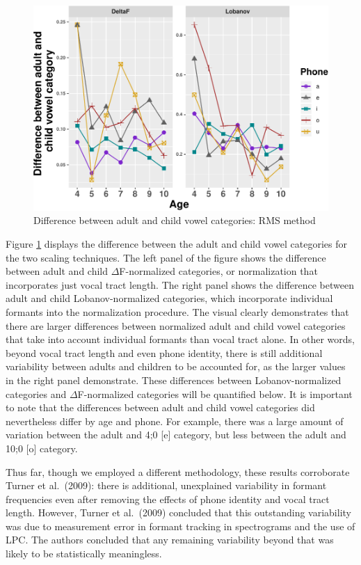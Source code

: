 \documentclass[
]{article}
\begin{document}
\begin{figure}
\centering
\includegraphics{3_vtl_results_files/figure-latex/rms-dif-figure-1.pdf}
\caption{\label{fig:rms-dif-figure}Difference between adult and child vowel categories: RMS method}
\end{figure}

Figure \ref{fig:rms-dif-figure} displays the difference between the adult and child vowel categories for the two scaling techniques. The left panel of the figure shows the difference between adult and child \(\Delta\)F-normalized categories, or normalization that incorporates just vocal tract length. The right panel shows the difference between adult and child Lobanov-normalized categories, which incorporate individual formants into the normalization procedure. The visual clearly demonstrates that there are larger differences between normalized adult and child vowel categories that take into account individual formants than vocal tract alone. In other words, beyond vocal tract length and even phone identity, there is still additional variability between adults and children to be accounted for, as the larger values in the right panel demonstrate. These differences between Lobanov-normalized categories and \(\Delta\)F-normalized categories will be quantified below. It is important to note that the differences between adult and child vowel categories did nevertheless differ by age and phone. For example, there was a large amount of variation between the adult and 4;0 {[}e{]} category, but less between the adult and 10;0 {[}o{]} category.

Thus far, though we employed a different methodology, these results corroborate Turner et al.~(2009): there is additional, unexplained variability in formant frequencies even after removing the effects of phone identity and vocal tract length. However, Turner et al.~(2009) concluded that this outstanding variability was due to measurement error in formant tracking in spectrograms and the use of LPC. The authors concluded that any remaining variability beyond that was likely to be statistically meaningless.
\end{document}
